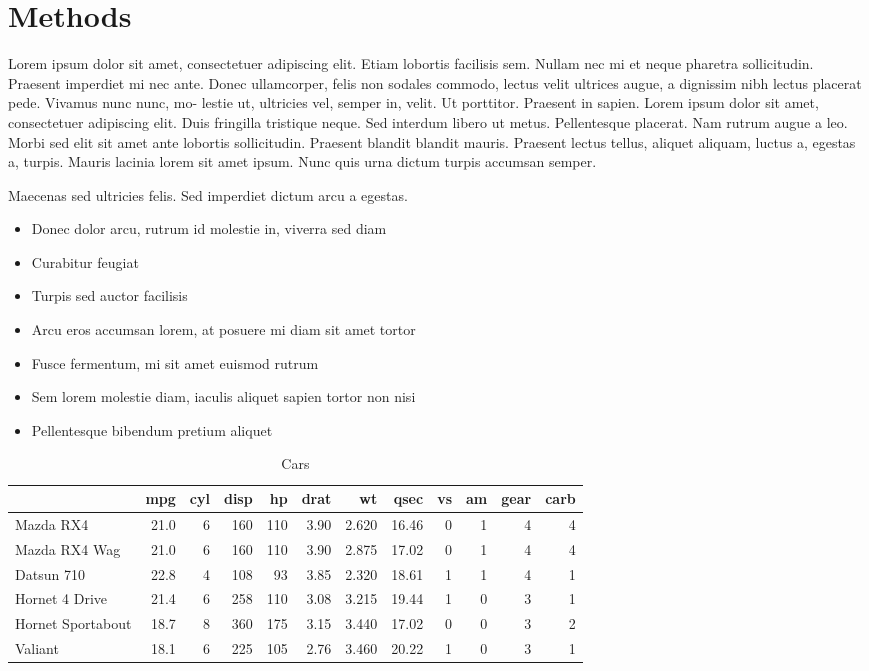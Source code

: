 \documentclass[
  9pt,
  twocolumn,
  twoside]{turbo}%
\providecommand{\tightlist}{%
  \setlength{\itemsep}{0pt}\setlength{\parskip}{0pt}}\usepackage{longtable,booktabs,array}
\begin{document}
\hypertarget{sec-methods}{%
\section{Methods}\label{sec-methods}}

Lorem ipsum dolor sit amet, consectetuer adipiscing elit. Etiam lobortis
facilisis sem. Nullam nec mi et neque pharetra sollicitudin. Praesent
imperdiet mi nec ante. Donec ullamcorper, felis non sodales commodo,
lectus velit ultrices augue, a dignissim nibh lectus placerat pede.
Vivamus nunc nunc, mo- lestie ut, ultricies vel, semper in, velit. Ut
porttitor. Praesent in sapien. Lorem ipsum dolor sit amet, consectetuer
adipiscing elit. Duis fringilla tristique neque. Sed interdum libero ut
metus. Pellentesque placerat. Nam rutrum augue a leo. Morbi sed elit sit
amet ante lobortis sollicitudin. Praesent blandit blandit mauris.
Praesent lectus tellus, aliquet aliquam, luctus a, egestas a, turpis.
Mauris lacinia lorem sit amet ipsum. Nunc quis urna dictum turpis
accumsan semper.

Maecenas sed ultricies felis. Sed imperdiet dictum arcu a egestas.

\begin{itemize}
\tightlist
\item
  Donec dolor arcu, rutrum id molestie in, viverra sed diam
\item
  Curabitur feugiat
\item
  Turpis sed auctor facilisis
\item
  Arcu eros accumsan lorem, at posuere mi diam sit amet tortor
\item
  Fusce fermentum, mi sit amet euismod rutrum
\item
  Sem lorem molestie diam, iaculis aliquet sapien tortor non nisi
\item
  Pellentesque bibendum pretium aliquet
\end{itemize}

\begin{table*}

\caption{Cars}
\centering
\begin{tabular}[t]{lrrrrrrrrrrr}
\toprule
  & mpg & cyl & disp & hp & drat & wt & qsec & vs & am & gear & carb\\
\midrule
Mazda RX4 & 21.0 & 6 & 160 & 110 & 3.90 & 2.620 & 16.46 & 0 & 1 & 4 & 4\\
Mazda RX4 Wag & 21.0 & 6 & 160 & 110 & 3.90 & 2.875 & 17.02 & 0 & 1 & 4 & 4\\
Datsun 710 & 22.8 & 4 & 108 & 93 & 3.85 & 2.320 & 18.61 & 1 & 1 & 4 & 1\\
Hornet 4 Drive & 21.4 & 6 & 258 & 110 & 3.08 & 3.215 & 19.44 & 1 & 0 & 3 & 1\\
Hornet Sportabout & 18.7 & 8 & 360 & 175 & 3.15 & 3.440 & 17.02 & 0 & 0 & 3 & 2\\
\addlinespace
Valiant & 18.1 & 6 & 225 & 105 & 2.76 & 3.460 & 20.22 & 1 & 0 & 3 & 1\\
\bottomrule
\end{tabular}
\end{table*}
\end{document}
